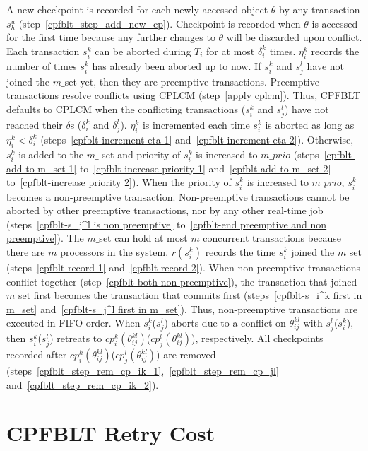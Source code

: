 \documentclass[conference]{IEEEtran}
\begin{document}
%
A new checkpoint is recorded for each newly accessed object $\theta$ by any transaction $s_h^u$ (step~\ref{cpfblt_step_add_new_cp}). Checkpoint is recorded when $\theta$ is accessed for the first time because any further changes to $\theta$ will be discarded upon conflict. Each transaction $s_{i}^{k}$ can be aborted during $T_i$ for at most $\delta_{i}^{k}$ times. $\eta_{i}^{k}$ records  the number of times $s_{i}^{k}$ has already been aborted up to now. If $s_i^k$ and $s_j^l$ have not joined the $m\_$set yet, then they are preemptive transactions. Preemptive transactions resolve conflicts using CPLCM (step~\ref{apply cplcm}). Thus, CPFBLT defaults to CPLCM when the conflicting transactions ($s_i^k$ and $s_j^l$) have not reached their $\delta$s ($\delta_i^k$ and $\delta_j^l$). $\eta_i^k$ is incremented each time $s_{i}^k$ is aborted as long as $\eta_i^k < \delta_i^k$ (steps~\ref{cpfblt-increment eta 1} and~\ref{cpfblt-increment eta 2}). Otherwise, $s_i^k$ is added to the $m\_$ set and priority of $s_{i}^k$ is increased to $m\_prio$ (steps~\ref{cpfblt-add to m_set 1} to~\ref{cpfblt-increase priority 1} and~\ref{cpfblt-add to m_set 2} to~\ref{cpfblt-increase priority 2}). When the priority of $s_i^k$ is increased to $m\_prio$, $s_i^k$ becomes a non-preemptive transaction. Non-preemptive transactions cannot be aborted by other preemptive transactions, nor by any other real-time job (steps~\ref{cpfblt-s_j^l is non preemptive} to~\ref{cpfblt-end preemptive and non preemptive}). The $m\_$set can hold at most $m$ concurrent transactions because there are $m$ processors in the system. $r(s_i^k)$ records the time $s_i^k$ joined the $m\_$set (steps~\ref{cpfblt-record 1} and~\ref{cpfblt-record 2}). When non-preemptive transactions conflict together (step~\ref{cpfblt-both non preemptive}), the transaction that joined $m\_$set first becomes the transaction that commits first (steps~\ref{cpfblt-s_i^k first in m_set} and~\ref{cpfblt-s_j^l first in m_set}). Thus, non-preemptive transactions are executed in FIFO order. When $s_i^k$($s_j^l$) aborts due to a conflict on $\theta_{ij}^{kl}$ with $s_j^l$($s_i^k$), then $s_i^k$($s_j^l$) retreats to $cp_i^k(\theta_{ij}^{kl})$($cp_j^l(\theta_{ij}^{kl})$), respectively. All checkpoints recorded after $cp_i^k(\theta_{ij}^{kl})$($cp_j^l(\theta_{ij}^{kl})$) are removed (steps~\ref{cpfblt_step_rem_cp_ik_1},~\ref{cpfblt_step_rem_cp_jl} and~\ref{cpfblt_step_rem_cp_ik_2}). 

\section{CPFBLT Retry Cost}\label{sec:cpfblt rc}
\end{document}
